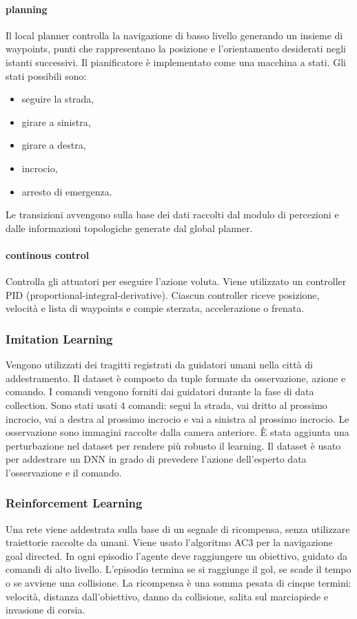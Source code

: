 \paragraph{planning} Il local planner controlla la navigazione di basso livello generando un insieme di waypoints, punti che rappresentano la posizione e l'orientamento desiderati
negli istanti successivi. Il pianificatore è implementato come una macchina a stati. Gli stati possibili sono:
\begin{itemize}
    \item seguire la strada,
    \item girare a sinistra,
    \item girare a destra,
    \item incrocio,
    \item arresto di emergenza.
\end{itemize}
Le transizioni avvengono sulla base dei dati raccolti dal modulo di percezioni e dalle informazioni topologiche generate dal global planner.
\paragraph{continous control} Controlla gli attuatori per eseguire l'azione voluta. Viene utilizzato un controller PID (proportional-integral-derivative).
Ciascun controller riceve posizione, velocità e lista di waypoints e compie sterzata, accelerazione o frenata.
\subsubsection{Imitation Learning}
Vengono utilizzati dei tragitti registrati da guidatori umani nella città di addestramento. Il dataset è composto da tuple formate da osservazione, azione e comando.
I comandi vengono forniti dai guidatori durante la fase di data collection. Sono stati usati 4 comandi: segui la strada, vai dritto al prossimo incrocio, vai a destra al prossimo incrocio e vai a sinistra al 
prossimo incrocio. Le osservazione sono immagini raccolte dalla camera anteriore. È stata aggiunta una perturbazione nel dataset per rendere più robusto il learning.
Il dataset è usato per addestrare un DNN in grado di prevedere l'azione dell'esperto data l'osservazione e il comando.
\subsubsection{Reinforcement Learning}
Una rete viene addestrata sulla base  di un segnale di ricompensa, senza utilizzare traiettorie raccolte da umani. Viene usato l'algoritmo AC3 per la navigazione goal directed.
In ogni episodio l'agente deve raggiungere un obiettivo, guidato da comandi di alto livello. L'episodio termina se si raggiunge il gol, se scade il tempo o se avviene una collisione.
La ricompensa è una somma pesata di cinque termini: velocità, distanza dall'obiettivo, danno da collisione, salita sul marciapiede e invasione di corsia.